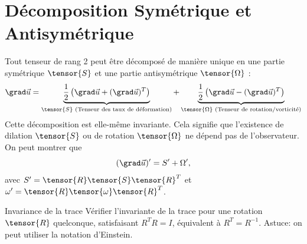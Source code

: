 \section{Décomposition Symétrique et Antisymétrique}
Tout tenseur de rang 2 peut être décomposé de manière unique en une partie symétrique $\tensor{S}$ et une partie antisymétrique $\tensor{\Omega}$ :
\begin{equation}
    \grad\vec{u} = \underbrace{\frac{1}{2}\left( \grad\vec{u} + (\grad\vec{u})^T \right)}_{\tensor{S} \text{ (Tenseur des taux de déformation)}} + \underbrace{\frac{1}{2}\left( \grad\vec{u} - (\grad\vec{u})^T \right)}_{\tensor{\Omega} \text{ (Tenseur de rotation/vorticité)}}
\end{equation}
Cette décomposition est elle-même invariante. Cela signifie que l'existence de dilation $\tensor{S}$ ou de rotation $\tensor{\Omega}$ ne dépend pas de l'observateur. On peut montrer que 
\begin{displaymath}
  (\grad\vec{u})'= S^\prime + \Omega^\prime,
\end{displaymath}
avec $S^\prime = \tensor{R}\tensor{S}\tensor{R}^T$ et 
$\omega^\prime = \tensor{R}\tensor{\omega}\tensor{R}^T$. 


\begin{studentinvestigation}{Invariance de la trace}
  Vérifier l'invariante de la trace pour une rotation $\tensor{R}$ quelconque, satisfaisant $R^T R = I$, équivalent à $R^T = R^{-1}$. Astuce: on peut utiliser la notation d'Einstein. 
\end{studentinvestigation}
